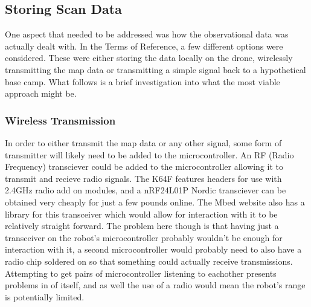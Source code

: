 				\subsection{Storing Scan Data}
				One aspect that needed to be addressed was how the observational data was actually dealt with. In the Terms of Reference, a few different options were considered. These were either storing the data locally on the drone, wirelessly transmitting the map data or transmitting a simple signal back to a hypothetical base camp. What follows is a brief investigation into what the most viable approach might be.
				
					\subsubsection{Wireless Transmission}
					In order to either transmit the map data or any other signal, some form of transmitter will likely need to be added to the microcontroller. An RF (Radio Frequency) transciever could be added to the microcontroller allowing it to transmit and recieve radio signals. The K64F features headers for use with 2.4GHz radio add on modules, and a nRF24L01P Nordic transciever can be obtained very cheaply for just a few pounds online. The Mbed website also has a library\citep{nRF24L01Plibrary} for this transceiver which would allow for interaction with it to be relatively straight forward. The problem here though is that having just a transceiver on the robot's microcontroller probably wouldn't be enough for interaction with it, a second microcontroller would probably need to also have a radio chip soldered on so that something could actually receive transmissions. Attempting to get pairs of microcontroller listening to eachother presents problems in of itself, and as well the use of a radio would mean the robot's range is potentially limited.
					
